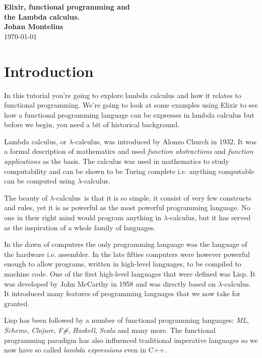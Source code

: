 \documentclass[a4paper,11pt]{article}
\newcommand{\nnsection}[1]{
\section*{#1}
\addcontentsline{toc}{section}{#1}
}
\begin{document}
\begin{center}
\vspace{20pt}
\textbf{\large Elixir, functional programming and\\ the Lambda calculus.}\\
\vspace{10pt}
\textbf{Johan Montelius}\\
\vspace{10pt}
\today{}
\end{center}

\newcommand{\lamc}[0]{$\lambda$-calculus}
\newcommand{\lama}[0]{$\lambda$-abstraction}
\newcommand{\lame}[0]{$\lambda$-expression}
\newcommand{\alphac}[0]{$\alpha$-conversion}
\newcommand{\betar}[0]{$\beta$-reduction}
\newcommand{\etac}[0]{$\eta$-conversion}

\nnsection{Introduction}

In this tutorial you're going to explore lambda calculus and how it
relates to functional programming. We're going to look at some
examples using Elixir to see how a functional programming language can
be expresses in lambda calculus but before we begin, you need a bit of
historical background.

Lambda calculus, or \lamc, was introduced by Alonzo Church in 1932. It
was a formal description of mathematics and used {\em function abstractions}
and {\em function applications} as the basis. The calculus was used in
mathematics to study computability and can be shown to be Turing
complete i.e. anything computable can be computed using \lamc.


The beauty of \lamc\ is that it is so simple, it consist of very few
constructs and rules, yet it is as powerful as the most powerful
programming language. No one in their right mind would program
anything in \lamc, but it has served as the inspiration of a whole
family of languages.

In the dawn of computers the only programming language was the language of
the hardware i.e. assembler. In the late fifties computers were
however powerful enough to allow programs, written in high-level
languages, to be compiled to machine code. One of the first high-level
languages that were defined was Lisp. It was developed by John
McCarthy in 1958 and was directly based on \lamc. It introduced many
features of programming languages that we now take for granted.

Lisp has been followed by a number of functional
programming languages: {\em ML}, {\em Scheme}, {\em Clojure}, {\em
  F\#}, {\em Haskell}, {\em Scala} and many more. The functional
programming paradigm has also influenced traditional imperative
languages so we now have so called {\em lambda expressions} even in C++.
\end{document}
